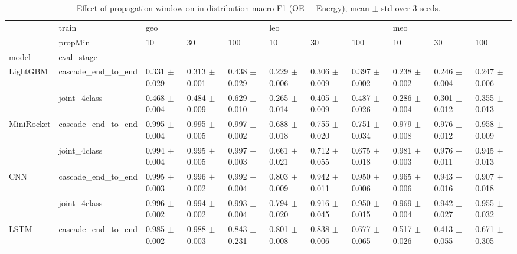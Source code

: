 \begin{table}
\centering
\caption{Effect of propagation window on in-distribution macro-F1 (OE + Energy), mean $\pm$ std over 3 seeds.}
\label{tab:window}
\begin{tabular}{lllllllllll}
\toprule
            & train & \multicolumn{3}{l}{geo} & \multicolumn{3}{l}{leo} & \multicolumn{3}{l}{meo} \\
            & propMin &                10  &                30  &                100 &                10  &                30  &                100 &                10  &                30  &                100 \\
model & eval_stage &                    &                    &                    &                    &                    &                    &                    &                    &                    \\
\midrule
LightGBM & cascade_end_to_end &  0.331 $\pm$ 0.029 &  0.313 $\pm$ 0.001 &  0.438 $\pm$ 0.029 &  0.229 $\pm$ 0.006 &  0.306 $\pm$ 0.009 &  0.397 $\pm$ 0.002 &  0.238 $\pm$ 0.002 &  0.246 $\pm$ 0.004 &  0.247 $\pm$ 0.006 \\
            & joint_4class &  0.468 $\pm$ 0.004 &  0.484 $\pm$ 0.009 &  0.629 $\pm$ 0.010 &  0.265 $\pm$ 0.014 &  0.405 $\pm$ 0.009 &  0.487 $\pm$ 0.026 &  0.286 $\pm$ 0.004 &  0.301 $\pm$ 0.012 &  0.355 $\pm$ 0.013 \\
MiniRocket & cascade_end_to_end &  0.995 $\pm$ 0.004 &  0.995 $\pm$ 0.005 &  0.997 $\pm$ 0.002 &  0.688 $\pm$ 0.018 &  0.755 $\pm$ 0.020 &  0.751 $\pm$ 0.034 &  0.979 $\pm$ 0.008 &  0.976 $\pm$ 0.012 &  0.958 $\pm$ 0.009 \\
            & joint_4class &  0.994 $\pm$ 0.004 &  0.995 $\pm$ 0.005 &  0.997 $\pm$ 0.003 &  0.661 $\pm$ 0.021 &  0.712 $\pm$ 0.055 &  0.675 $\pm$ 0.018 &  0.981 $\pm$ 0.003 &  0.976 $\pm$ 0.011 &  0.945 $\pm$ 0.013 \\
CNN & cascade_end_to_end &  0.995 $\pm$ 0.003 &  0.996 $\pm$ 0.002 &  0.992 $\pm$ 0.004 &  0.803 $\pm$ 0.009 &  0.942 $\pm$ 0.011 &  0.950 $\pm$ 0.006 &  0.965 $\pm$ 0.006 &  0.943 $\pm$ 0.016 &  0.907 $\pm$ 0.018 \\
            & joint_4class &  0.996 $\pm$ 0.002 &  0.994 $\pm$ 0.002 &  0.993 $\pm$ 0.004 &  0.794 $\pm$ 0.020 &  0.916 $\pm$ 0.045 &  0.950 $\pm$ 0.015 &  0.969 $\pm$ 0.004 &  0.942 $\pm$ 0.027 &  0.955 $\pm$ 0.032 \\
LSTM & cascade_end_to_end &  0.985 $\pm$ 0.002 &  0.988 $\pm$ 0.003 &  0.843 $\pm$ 0.231 &  0.801 $\pm$ 0.008 &  0.838 $\pm$ 0.006 &  0.677 $\pm$ 0.065 &  0.517 $\pm$ 0.026 &  0.413 $\pm$ 0.055 &  0.671 $\pm$ 0.305 \\

\end{tabular}
\end{table}
